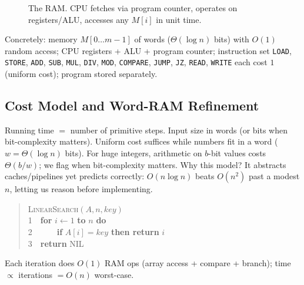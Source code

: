 \begin{figure}[h]
{}%
\caption{The RAM. CPU fetches via program counter, operates on registers/ALU, accesses any $M[i]$ in unit time.}
\label{fig:ram-model}
\end{figure}
Concretely: memory $M[0\ldots m-1]$ of words ($\Theta(\log n)$ bits) with $O(1)$ random access; CPU registers + ALU + program counter; instruction set \texttt{LOAD}, \texttt{STORE}, \texttt{ADD}, \texttt{SUB}, \texttt{MUL}, \texttt{DIV}, \texttt{MOD}, \texttt{COMPARE}, \texttt{JUMP}, \texttt{JZ}, \texttt{READ}, \texttt{WRITE} each cost $1$ (uniform cost); program stored separately.
\subsection{Cost Model and Word-RAM Refinement}
Running time $=$ number of primitive steps. Input size in words (or bits when bit-complexity matters). Uniform cost suffices while numbers fit in a word ($w=\Theta(\log n)$ bits). For huge integers, arithmetic on $b$-bit values costs $\Theta(b/w)$; we flag when bit-complexity matters.
Why this model? It abstracts caches/pipelines yet predicts correctly: $O(n\log n)$ beats $O(n^2)$ past a modest $n$, letting us reason before implementing.
\begin{example}
\begin{quote}\ttfamily
\textsc{LinearSearch}$(A,n,key)$\\
1\ \ \textbf{for} $i\gets1$ \textbf{to} $n$ \textbf{do}\\
2\ \ \ \ \ \ \textbf{if} $A[i]=key$ \textbf{then return} $i$\\
3\ \ \textbf{return} NIL
\end{quote}
Each iteration does $O(1)$ RAM ops (array access + compare + branch); time $\propto$ iterations $=O(n)$ worst-case.
\end{example}

